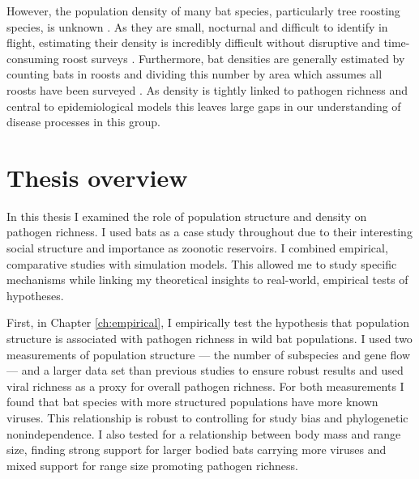 However, the population density of many bat species, particularly tree roosting species, is unknown \cite{clement2013estimating}.
As they are small, nocturnal and difficult to identify in flight, estimating their density is incredibly difficult without disruptive and time-consuming roost surveys \cite{kloepper2016estimating, humphrey1971photographic, sabol1995technique}.
Furthermore, bat densities are generally estimated by counting bats in roosts and dividing this number by area which assumes all roosts have been surveyed \cite{speakman1991minimum, zahn2006population, moreno2004colony}. 
As density is tightly linked to pathogen richness \cite{kamiya2014determines} and central to epidemiological models \cite{may1979population, anderson1979population} this leaves large gaps in our understanding of disease processes in this group.





\section{Thesis overview}

In this thesis I examined the role of population structure and density on pathogen richness.
I used bats as a case study throughout due to their interesting social structure and importance as zoonotic	reservoirs.
I combined empirical, comparative studies with simulation models.
This allowed me to study specific mechanisms while linking my theoretical insights to real-world, empirical tests of hypotheses.



First, in Chapter \ref{ch:empirical}, I empirically test the hypothesis that population structure is associated with pathogen richness in wild bat populations.
I used two measurements of population structure --- the number of subspecies and gene flow --- and a larger data set than previous studies to ensure robust results and used viral richness as a proxy for overall pathogen richness.
For both measurements I found that bat species with more structured populations have more known viruses.
This relationship is robust to controlling for study bias and phylogenetic nonindependence.
I also tested for a relationship between body mass and range size, finding strong support for larger bodied bats carrying more viruses and mixed support for range size promoting pathogen richness.


